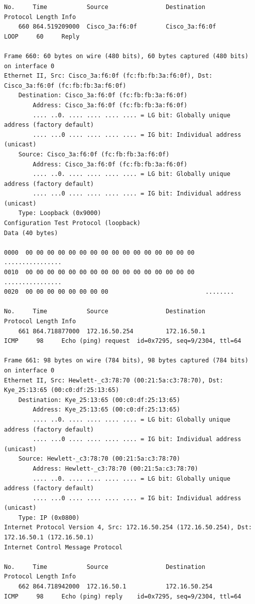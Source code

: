 \documentclass[a4paper,11pt]{article}
\begin{document}
\begin{lstlisting}
No.     Time           Source                Destination           Protocol Length Info
    660 864.519209000  Cisco_3a:f6:0f        Cisco_3a:f6:0f        LOOP     60     Reply

Frame 660: 60 bytes on wire (480 bits), 60 bytes captured (480 bits) on interface 0
Ethernet II, Src: Cisco_3a:f6:0f (fc:fb:fb:3a:f6:0f), Dst: Cisco_3a:f6:0f (fc:fb:fb:3a:f6:0f)
    Destination: Cisco_3a:f6:0f (fc:fb:fb:3a:f6:0f)
        Address: Cisco_3a:f6:0f (fc:fb:fb:3a:f6:0f)
        .... ..0. .... .... .... .... = LG bit: Globally unique address (factory default)
        .... ...0 .... .... .... .... = IG bit: Individual address (unicast)
    Source: Cisco_3a:f6:0f (fc:fb:fb:3a:f6:0f)
        Address: Cisco_3a:f6:0f (fc:fb:fb:3a:f6:0f)
        .... ..0. .... .... .... .... = LG bit: Globally unique address (factory default)
        .... ...0 .... .... .... .... = IG bit: Individual address (unicast)
    Type: Loopback (0x9000)
Configuration Test Protocol (loopback)
Data (40 bytes)

0000  00 00 00 00 00 00 00 00 00 00 00 00 00 00 00 00   ................
0010  00 00 00 00 00 00 00 00 00 00 00 00 00 00 00 00   ................
0020  00 00 00 00 00 00 00 00                           ........

No.     Time           Source                Destination           Protocol Length Info
    661 864.718877000  172.16.50.254         172.16.50.1           ICMP     98     Echo (ping) request  id=0x7295, seq=9/2304, ttl=64

Frame 661: 98 bytes on wire (784 bits), 98 bytes captured (784 bits) on interface 0
Ethernet II, Src: Hewlett-_c3:78:70 (00:21:5a:c3:78:70), Dst: Kye_25:13:65 (00:c0:df:25:13:65)
    Destination: Kye_25:13:65 (00:c0:df:25:13:65)
        Address: Kye_25:13:65 (00:c0:df:25:13:65)
        .... ..0. .... .... .... .... = LG bit: Globally unique address (factory default)
        .... ...0 .... .... .... .... = IG bit: Individual address (unicast)
    Source: Hewlett-_c3:78:70 (00:21:5a:c3:78:70)
        Address: Hewlett-_c3:78:70 (00:21:5a:c3:78:70)
        .... ..0. .... .... .... .... = LG bit: Globally unique address (factory default)
        .... ...0 .... .... .... .... = IG bit: Individual address (unicast)
    Type: IP (0x0800)
Internet Protocol Version 4, Src: 172.16.50.254 (172.16.50.254), Dst: 172.16.50.1 (172.16.50.1)
Internet Control Message Protocol

No.     Time           Source                Destination           Protocol Length Info
    662 864.718942000  172.16.50.1           172.16.50.254         ICMP     98     Echo (ping) reply    id=0x7295, seq=9/2304, ttl=64


\end{lstlisting}
\end{document}
